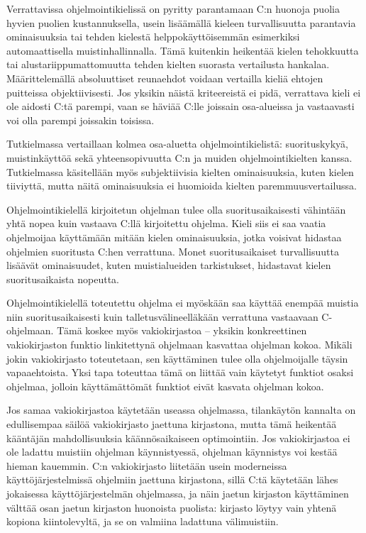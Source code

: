 Verrattavissa ohjelmointikielissä on pyritty parantamaan C:n huonoja puolia
hyvien puolien kustannuksella, usein lisäämällä kieleen turvallisuutta
parantavia ominaisuuksia tai tehden kielestä helppokäyttöisemmän esimerkiksi
automaattisella muistinhallinnalla. Tämä kuitenkin heikentää kielen tehokkuutta
tai alustariippumattomuutta tehden kielten suorasta vertailusta hankalaa.
Määrittelemällä absoluuttiset reunaehdot voidaan vertailla kieliä ehtojen
puitteissa objektiivisesti. Jos yksikin näistä kriteereistä ei pidä, verrattava
kieli ei ole aidosti C:tä parempi, vaan se häviää C:lle joissain osa-alueissa
ja vastaavasti voi olla parempi joissakin toisissa.

Tutkielmassa vertaillaan kolmea osa-aluetta ohjelmointikielistä: suorituskykyä,
muistinkäyttöä sekä yhteensopivuutta C:n ja muiden ohjelmointikielten kanssa.
Tutkielmassa käsitellään myös subjektiivisia kielten ominaisuuksia, kuten
kielen tiiviyttä, mutta näitä
ominaisuuksia ei huomioida kielten paremmuusvertailussa.

Ohjelmointikielellä kirjoitetun ohjelman tulee olla suoritusaikaisesti
vähintään yhtä nopea kuin vastaava C:llä kirjoitettu ohjelma. Kieli siis ei saa
vaatia ohjelmoijaa käyttämään mitään kielen ominaisuuksia, jotka voisivat
hidastaa ohjelmien suoritusta C:hen verrattuna. Monet suoritusaikaiset
turvallisuutta lisäävät ominaisuudet, kuten muistialueiden tarkistukset,
hidastavat kielen suoritusaikaista nopeutta.

Ohjelmointikielellä toteutettu ohjelma ei myöskään saa käyttää enempää muistia
niin suoritusaikaisesti kuin talletusvälineelläkään verrattuna vastaavaan
C-ohjelmaan. Tämä koskee myös vakiokirjastoa --
yksikin konkreettinen vakiokirjaston funktio linkitettynä ohjelmaan kasvattaa
ohjelman kokoa. Mikäli jokin vakiokirjasto toteutetaan, sen käyttäminen tulee
olla ohjelmoijalle täysin vapaaehtoista. Yksi tapa toteuttaa tämä on liittää
vain käytetyt funktiot osaksi ohjelmaa, jolloin käyttämättömät funktiot eivät
kasvata ohjelman kokoa.

Jos samaa vakiokirjastoa käytetään useassa ohjelmassa, tilankäytön kannalta on
edullisempaa säilöä vakiokirjasto jaettuna kirjastona, mutta tämä heikentää
kääntäjän mahdollisuuksia käännösaikaiseen optimointiin. Jos vakiokirjastoa ei
ole ladattu muistiin ohjelman käynnistyessä, ohjelman käynnistys voi kestää
hieman kauemmin. C:n vakiokirjasto liitetään usein moderneissa
käyttöjärjestelmissä ohjelmiin jaettuna kirjastona, sillä C:tä käytetään lähes
jokaisessa käyttöjärjestelmän ohjelmassa, ja näin jaetun kirjaston käyttäminen
välttää osan jaetun kirjaston huonoista puolista: kirjasto löytyy vain yhtenä
kopiona kiintolevyltä, ja se on valmiina ladattuna välimuistiin.

